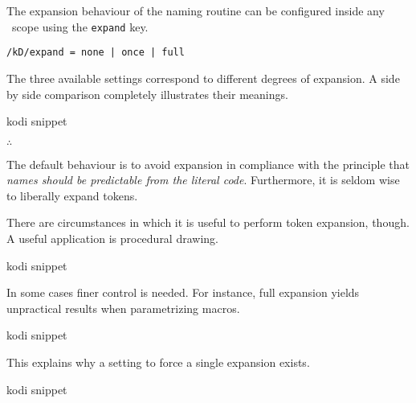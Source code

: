 The expansion behaviour of the naming routine can be configured
inside any \koDi\ scope using the \lstinline!expand! key.

\begin{lstlisting}
/kD/expand = none | once | full
\end{lstlisting}

The three available settings correspond to different degrees of expansion.
A side by side comparison completely illustrates their meanings.

\begin{tcblisting}{kodi snippet}
\end{tcblisting}

\hfill$\therefore$\hfill\null

The default behaviour is to avoid expansion in compliance with the principle
that \emph{names should be predictable from the \emph{literal} code}.
Furthermore, it is seldom wise to liberally expand tokens.

There are circumstances in which it is useful to perform token expansion,
though. A useful application is procedural drawing.

\begin{tcblisting}{kodi snippet}
\end{tcblisting}

In some cases finer control is needed. For instance, full expansion
yields unpractical results when parametrizing macros.

\begin{tcblisting}{kodi snippet}
\end{tcblisting}

This explains why a setting to force a single expansion exists.

\begin{tcblisting}{kodi snippet}
\end{tcblisting}
